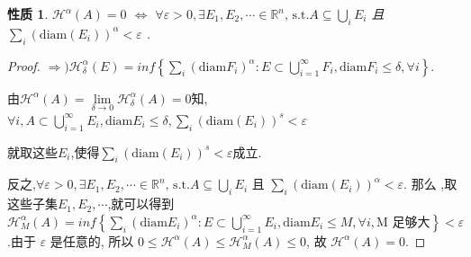 \documentclass[hyperref,a4paper,UTF8]{ctexart}
\newtheorem{property}{{性质}}
\begin{document}
  \begin{property}
    $\mathcal{H}^\alpha(A) = 0$ $\Leftrightarrow$
      $ \forall \varepsilon > 0, \exists E_{1}, E_{2}, \cdots \in  \mathbb{R}^{n}\text{, s.t.} A \subseteq \bigcup\limits_{i} E_{i}$ 且 $\sum_{i}\left(\mathrm{diam}\left(E_{i}\right)\right)^{\alpha}<\varepsilon$ . 
  \end{property}
  \begin{proof}
      $ \Rightarrow) \mathcal{H}^\alpha_\delta(E) = inf \left\{\sum\limits_{i}\left(\mathrm{diam} F_i\right)^\alpha: E \subset \bigcup\limits_{i=1}^{\infty} F_i, \mathrm{diam} F_i \leqslant \delta, \forall i\right\}$. 

      由$ \mathcal{H}^\alpha(A) = \lim\limits_{\delta \to 0} \mathcal{H}_\delta^\alpha(A) = 0$知, $\forall i,A \subset \bigcup\limits_{i=1}^{\infty} E_i, \mathrm{diam} E_i \leqslant \delta, \sum\limits_{i}\left(\mathrm{diam}\left(E_{i}\right)\right)^{s}<\varepsilon$
      
      就取这些$E_i$,使得$\sum\limits_{i}\left(\mathrm{diam}\left(E_{i}\right)\right)^{s}<\varepsilon$成立.

      反之,$ \forall \varepsilon > 0, \exists E_{1}, E_{2}, \cdots \in  \mathbb{R}^{n}\text{, s.t.} A \subseteq \bigcup\limits_{i} E_{i}$ 且 $\sum_{i}\left(\mathrm{diam}\left(E_{i}\right)\right)^{\alpha}<\varepsilon$. 
      那么 ,取这些子集$E_{1}, E_{2}, \cdots$,就可以得到$\mathcal{H}^\alpha_M(A) = inf \left\{\sum_{i}\left(\mathrm{diam} E_i\right)^\alpha: E \subset \bigcup_{i=1}^{\infty} E_i, \mathrm{diam} E_i \leqslant M,\forall i,\text{M 足够大}\right\} < \varepsilon$.由于 $\varepsilon$ 是任意的, 所以 $0 \leqslant \mathcal{H}^\alpha(A) \leqslant \mathcal{H}^\alpha_M(A) \leqslant 0 $, 故 $\mathcal{H}^\alpha(A) = 0$.

  \end{proof}

\end{document}
